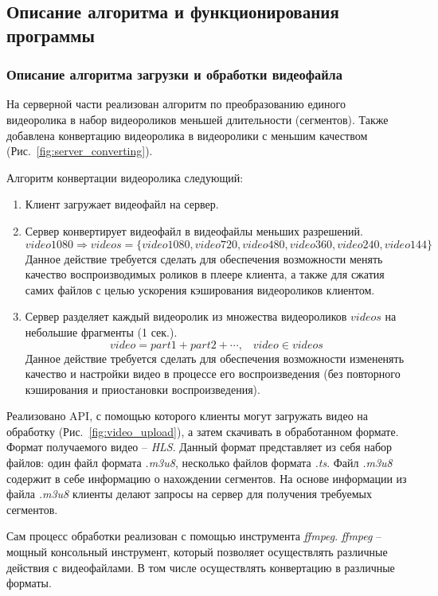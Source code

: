 \documentclass{../includes/TechDoc}
\begin{document}
    \subsection{Описание алгоритма и функционирования программы}

    \subsubsection{Описание алгоритма загрузки и обработки видеофайла}

    На серверной части реализован алгоритм по преобразованию единого видеоролика в набор видеороликов меньшей длительности (сегментов).
    Также добавлена конвертацию видеоролика в видеоролики с меньшим качеством (Рис.~\ref{fig:server_converting}).

    Алгоритм конвертации видеоролика следующий:
    \begin{enumerate}
        \item Клиент загружает видеофайл на сервер.
        \item Сервер конвертирует видеофайл в видеофайлы меньших разрешений.
        \[ video1080 \Rightarrow videos = \{ video1080, video720, video480, video360, video240, video144 \} \]
        Данное действие требуется сделать для обеспечения возможности менять качество воспроизводимых роликов в плеере клиента,
        а также для сжатия самих файлов с целью ускорения кэширования видеороликов клиентом.
        \item Сервер разделяет каждый видеоролик из множества видеороликов \(videos\) на небольшие фрагменты (1 сек.).
        \[ video = part1 + part2 + \cdots, \;\;\; video \in videos \]
        Данное действие требуется сделать для обеспечения возможности измененять качество и настройки видео в процессе его воспроизведения
        (без повторного кэширования и приостановки воспроизведения).
    \end{enumerate}

    Реализовано API, с помощью которого клиенты могут загружать видео на обработку (Рис.~\ref{fig:video_upload}), а затем скачивать в обработанном формате.
    Формат получаемого видео -- \emph{HLS}. Данный формат представляет из себя набор файлов: один файл формата \emph{.m3u8}, несколько файлов формата \emph{.ts}.
    Файл \emph{.m3u8} содержит в себе информацию о нахождении сегментов.
    На основе информации из файла \emph{.m3u8} клиенты делают запросы на сервер для получения требуемых сегментов.

    Сам процесс обработки реализован с помощью инструмента \emph{ffmpeg}.
    \emph{ffmpeg} -- мощный консольный инструмент, который позволяет осуществлять различные действия с видеофайлами.
    В том числе осуществлять конвертацию в различные форматы.
\end{document}
